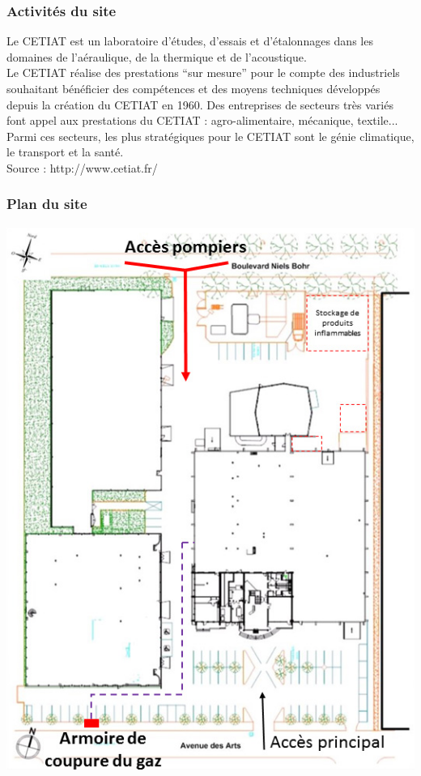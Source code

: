 \documentclass[hidelinks, paper=a4, fontsize=13pt]{report}
\begin{document}
\subsubsection{Activités du site}

Le CETIAT est un laboratoire d'études, d'essais et d'étalonnages dans les domaines de l'aéraulique, de la thermique et de l'acoustique. \\

Le CETIAT réalise des prestations “sur mesure” pour le compte des industriels souhaitant bénéficier des compétences et des moyens techniques développés depuis la création du CETIAT en 1960. Des entreprises de secteurs très variés font appel aux prestations du CETIAT : agro-alimentaire, mécanique, textile... Parmi ces secteurs, les plus stratégiques pour le CETIAT sont le génie climatique, le transport et la santé.\\

Source : http://www.cetiat.fr/

\subsubsection{Plan du site}

\begin{center}
	\includegraphics[scale=0.8]{Annexes/Plans/planCetiat}
\end{center}
\end{document}
